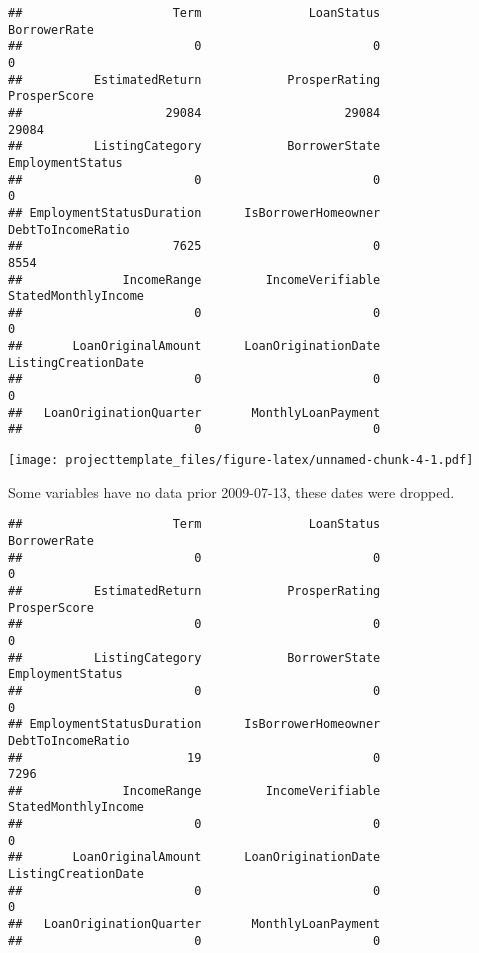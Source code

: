 \documentclass[]{article}
\begin{document}
\begin{verbatim}
##                     Term               LoanStatus             BorrowerRate 
##                        0                        0                        0 
##          EstimatedReturn            ProsperRating             ProsperScore 
##                    29084                    29084                    29084 
##          ListingCategory            BorrowerState         EmploymentStatus 
##                        0                        0                        0 
## EmploymentStatusDuration      IsBorrowerHomeowner        DebtToIncomeRatio 
##                     7625                        0                     8554 
##              IncomeRange         IncomeVerifiable      StatedMonthlyIncome 
##                        0                        0                        0 
##       LoanOriginalAmount      LoanOriginationDate      ListingCreationDate 
##                        0                        0                        0 
##   LoanOriginationQuarter       MonthlyLoanPayment 
##                        0                        0
\end{verbatim}

\texttt{[image: projecttemplate\_files/figure-latex/unnamed-chunk-4-1.pdf]}

Some variables have no data prior 2009-07-13, these dates were dropped.

\begin{verbatim}
##                     Term               LoanStatus             BorrowerRate 
##                        0                        0                        0 
##          EstimatedReturn            ProsperRating             ProsperScore 
##                        0                        0                        0 
##          ListingCategory            BorrowerState         EmploymentStatus 
##                        0                        0                        0 
## EmploymentStatusDuration      IsBorrowerHomeowner        DebtToIncomeRatio 
##                       19                        0                     7296 
##              IncomeRange         IncomeVerifiable      StatedMonthlyIncome 
##                        0                        0                        0 
##       LoanOriginalAmount      LoanOriginationDate      ListingCreationDate 
##                        0                        0                        0 
##   LoanOriginationQuarter       MonthlyLoanPayment 
##                        0                        0
\end{verbatim}
\end{document}
